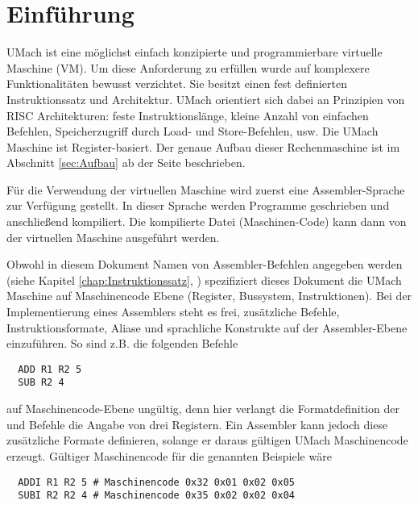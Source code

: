 \chapter{Einführung}

UMach ist eine möglichst einfach konzipierte und programmierbare virtuelle
Maschine (VM). Um diese Anforderung zu erfüllen wurde auf komplexere
Funktionalitäten bewusst verzichtet. Sie besitzt einen fest definierten 
Instruktionssatz und Architektur. UMach orientiert sich dabei an Prinzipien von
RISC Architekturen: feste Instruktionslänge, kleine Anzahl von einfachen
Befehlen, Speicherzugriff durch Load- und Store-Befehlen, usw. Die UMach
Maschine ist Register-basiert. Der genaue Aufbau dieser Rechenmaschine ist im
Abschnitt \ref{sec:Aufbau} ab der Seite \pageref{sec:Aufbau} beschrieben.


Für die Verwendung der virtuellen Maschine wird zuerst eine Assembler-Sprache
zur Verfügung gestellt. In dieser Sprache werden Programme geschrieben und
anschließend kompiliert. Die kompilierte Datei (Maschinen-Code) kann dann
von der virtuellen Maschine ausgeführt werden.

Obwohl in diesem Dokument Namen von Assembler-Befehlen angegeben werden (siehe 
Kapitel \ref{chap:Instruktionssatz}, )
spezifiziert dieses Dokument die UMach Maschine auf Maschinencode Ebene
(Register, Bussystem, Instruktionen).
Bei der Implementierung eines Assemblers steht es frei, zusätzliche Befehle,
Instruktionsformate, Aliase und sprachliche Konstrukte auf der Assembler-Ebene
einzuführen. So sind z.B. die folgenden Befehle
\begin{lstlisting}
  ADD R1 R2 5
  SUB R2 4
\end{lstlisting}
auf Maschinencode-Ebene ungültig, denn hier verlangt die Formatdefinition der
 und  Befehle die Angabe von drei Registern. Ein Assembler
kann jedoch diese zusätzliche Formate definieren, solange er daraus
gültigen UMach Maschinencode erzeugt.
Gültiger Maschinencode für die genannten Beispiele wäre
\begin{lstlisting}
  ADDI R1 R2 5 # Maschinencode 0x32 0x01 0x02 0x05
  SUBI R2 R2 4 # Maschinencode 0x35 0x02 0x02 0x04
\end{lstlisting}



